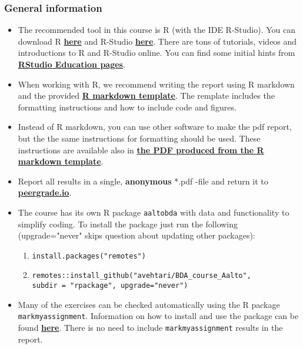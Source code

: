
\subsubsection*{General information}


\begin{itemize}
\itemsep0em
\item The recommended tool in this course is R (with the IDE R-Studio). You can download R \href{https://cran.r-project.org/}{\textbf{here}} and R-Studio \href{https://www.rstudio.com/products/rstudio/download/}{\textbf{here}}. There are tons of tutorials, videos and introductions to R and R-Studio online. You can find some initial hints from \href{https://education.rstudio.com/}{\textbf{RStudio Education pages}}.
\item When working with R, we recommend writing the report using R markdown and the provided \href{https://raw.githubusercontent.com/avehtari/BDA_course_Aalto/master/templates/assignment_template.rmd}{\textbf{R markdown template}}. The remplate includes the formatting instructions and how to include code and figures.
\item Instead of R markdown, you can use other software to make the pdf report, but the the same instructions for formatting should be used. These instructions are available also in \href{https://raw.githubusercontent.com/avehtari/BDA_course_Aalto/master/templates/assignment_template.pdf}{\textbf{the PDF produced from the R markdown template}}.
\item  Report all results in a single, {\bf anonymous} *.pdf -file and return it to \href{peergrade.io}{\textbf{peergrade.io}}.
\item The course has its own R package \texttt{aaltobda} with data and functionality to simplify coding. To install the package just run the following (upgrade="never" skips question about updating other packages):
\begin{enumerate}
\item \texttt{install.packages("remotes")}
\item \texttt{remotes::install\_github("avehtari/BDA\_course\_Aalto", \\ subdir = "rpackage", upgrade="never")}
\end{enumerate}
\item Many of the exercises can be checked automatically using the R package \\ \texttt{markmyassignment}. Information on how to install and use the package can be found \href{https://cran.r-project.org/web/packages/markmyassignment/vignettes/markmyassignment.html}{\textbf{here}}. There is no need to include \texttt{markmyassignment} results in the report.

\end{itemize}
